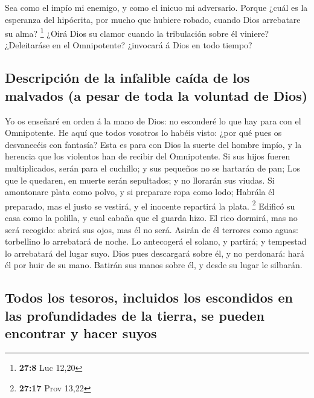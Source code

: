  Sea como el impío mi enemigo, y como el inicuo mi
adversario.  Porque ¿cuál es la esperanza del hipócrita, por
mucho que hubiere robado, cuando Dios arrebatare su alma? \footnote{\textbf{27:8}
  Luc 12,20}  ¿Oirá Dios su clamor cuando la tribulación
sobre él viniere?  ¿Deleitaráse en el Omnipotente?
¿invocará á Dios en todo tiempo?

\hypertarget{descripciuxf3n-de-la-infalible-cauxedda-de-los-malvados-a-pesar-de-toda-la-voluntad-de-dios}{%
\subsection{Descripción de la infalible caída de los malvados (a pesar
de toda la voluntad de
Dios)}\label{descripciuxf3n-de-la-infalible-cauxedda-de-los-malvados-a-pesar-de-toda-la-voluntad-de-dios}}

 Yo os enseñaré en orden á la mano de Dios: no esconderé lo
que hay para con el Omnipotente.  He aquí que todos
vosotros lo habéis visto: ¿por qué pues os desvanecéis con fantasía?
 Esta es para con Dios la suerte del hombre impío, y la
herencia que los violentos han de recibir del Omnipotente. 
Si sus hijos fueren multiplicados, serán para el cuchillo; y sus
pequeños no se hartarán de pan;  Los que le quedaren, en
muerte serán sepultados; y no llorarán sus viudas.  Si
amontonare plata como polvo, y si preparare ropa como lodo;
 Habrála él preparado, mas el justo se vestirá, y el
inocente repartirá la plata. \footnote{\textbf{27:17} Prov 13,22}
 Edificó su casa como la polilla, y cual cabaña que el
guarda hizo.  El rico dormirá, mas no será recogido: abrirá
sus ojos, mas él no será.  Asirán de él terrores como
aguas: torbellino lo arrebatará de noche.  Lo antecogerá el
solano, y partirá; y tempestad lo arrebatará del lugar suyo.
 Dios pues descargará sobre él, y no perdonará: hará él por
huir de su mano.  Batirán sus manos sobre él, y desde su
lugar le silbarán.

\hypertarget{todos-los-tesoros-incluidos-los-escondidos-en-las-profundidades-de-la-tierra-se-pueden-encontrar-y-hacer-suyos}{%
\subsection{Todos los tesoros, incluidos los escondidos en las
profundidades de la tierra, se pueden encontrar y hacer
suyos}\label{todos-los-tesoros-incluidos-los-escondidos-en-las-profundidades-de-la-tierra-se-pueden-encontrar-y-hacer-suyos}}


